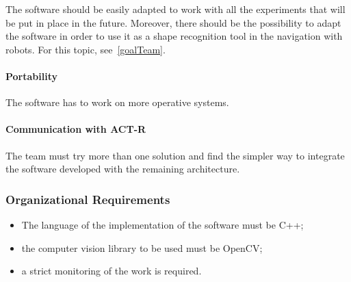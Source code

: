 				The software should be easily adapted to work with all the experiments that will be put in place in the future. Moreover, there should be the possibility to adapt the software in order to use it as a shape recognition tool in the navigation with robots. For this topic, see~\ref{goalTeam}. 				
			
				\paragraph{Portability} 

				The software has to work on more operative systems.
			
				\paragraph{Communication with ACT-R} 			
				The team must try more than one solution and find the simpler way to integrate the software developed with the remaining architecture.
			
			\subsubsection{Organizational Requirements}
			\begin{itemize}
				\item The language of the implementation of the software must be C++;
				\item the computer vision library to be used must be OpenCV;
			    	\item a strict monitoring of the work is required.					
			\end{itemize}
		

